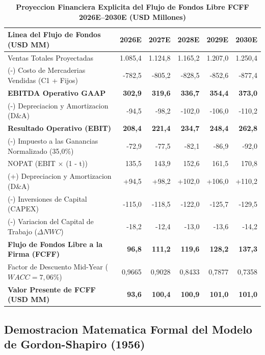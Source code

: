 \documentclass[10pt,a4paper]{article}
\theoremstyle{definition}
\begin{document}
\begin{table}[H]
\centering
\caption{\textbf{Proyeccion Financiera Explicita del Flujo de Fondos Libre FCFF 2026E--2030E (USD Millones)}}
\small
\begin{tabular}{lrrrrr}
\toprule
\textbf{Linea del Flujo de Fondos (USD MM)} & \textbf{2026E} & \textbf{2027E} & \textbf{2028E} & \textbf{2029E} & \textbf{2030E} \\
\midrule
Ventas Totales Proyectadas & 1.085,4 & 1.124,8 & 1.165,2 & 1.207,0 & 1.250,4 \\
(-) Costo de Mercaderias Vendidas (C1 + Fijos) & -782,5 & -805,2 & -828,5 & -852,6 & -877,4 \\
\midrule
\textbf{EBITDA Operativo GAAP} & \textbf{302,9} & \textbf{319,6} & \textbf{336,7} & \textbf{354,4} & \textbf{373,0} \\
(-) Depreciacion y Amortizacion (D\&A) & -94,5 & -98,2 & -102,0 & -106,0 & -110,2 \\
\midrule
\textbf{Resultado Operativo (EBIT)} & \textbf{208,4} & \textbf{221,4} & \textbf{234,7} & \textbf{248,4} & \textbf{262,8} \\
(-) Impuesto a las Ganancias Normalizado (35,0\%) & -72,9 & -77,5 & -82,1 & -86,9 & -92,0 \\
\midrule
NOPAT (EBIT $\times$ (1 - t)) & 135,5 & 143,9 & 152,6 & 161,5 & 170,8 \\
(+) Depreciacion y Amortizacion (D\&A) & +94,5 & +98,2 & +102,0 & +106,0 & +110,2 \\
(-) Inversiones de Capital (CAPEX) & -115,0 & -118,5 & -122,0 & -125,7 & -129,5 \\
(-) Variacion del Capital de Trabajo ($\Delta NWC$) & -18,2 & -12,4 & -13,0 & -13,6 & -14,2 \\
\midrule
\textbf{Flujo de Fondos Libre a la Firma (FCFF)} & \textbf{96,8} & \textbf{111,2} & \textbf{119,6} & \textbf{128,2} & \textbf{137,3} \\
Factor de Descuento Mid-Year ($WACC = 7,06\%$) & 0,9665 & 0,9028 & 0,8433 & 0,7877 & 0,7358 \\
\midrule
\textbf{Valor Presente de FCFF (USD MM)} & \textbf{93,6} & \textbf{100,4} & \textbf{100,9} & \textbf{101,0} & \textbf{101,0} \\
\bottomrule
\end{tabular}
\end{table}

\subsection{Demostracion Matematica Formal del Modelo de Gordon-Shapiro (1956)}
\end{document}
